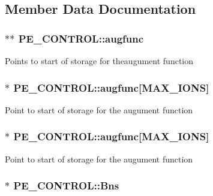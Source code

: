 \subsection{Member Data Documentation}
\hypertarget{struct_p_e___c_o_n_t_r_o_l_a850c9a27b78d815bc0a4f0f4bddc673e}{
\subsubsection[{augfunc}]{$\ast$$\ast$ P\-E\-\_\-\-C\-O\-N\-T\-R\-O\-L\-::augfunc}}\label{struct_p_e___c_o_n_t_r_o_l_a850c9a27b78d815bc0a4f0f4bddc673e}
Points to start of storage for theaugument function \hypertarget{struct_p_e___c_o_n_t_r_o_l_a715bfa0ce895f0a0aa9a2a9dba0613cd}{
\subsubsection[{augfunc}]{$\ast$ P\-E\-\_\-\-C\-O\-N\-T\-R\-O\-L\-::augfunc\mbox{[}{\bf M\-A\-X\-\_\-\-I\-O\-N\-S}\mbox{]}}}\label{struct_p_e___c_o_n_t_r_o_l_a715bfa0ce895f0a0aa9a2a9dba0613cd}
Point to start of storage for the augument function \hypertarget{struct_p_e___c_o_n_t_r_o_l_abe8ee2a8a452f14619312e9d70704a2f}{
\subsubsection[{augfunc}]{$\ast$ P\-E\-\_\-\-C\-O\-N\-T\-R\-O\-L\-::augfunc\mbox{[}{\bf M\-A\-X\-\_\-\-I\-O\-N\-S}\mbox{]}}}\label{struct_p_e___c_o_n_t_r_o_l_abe8ee2a8a452f14619312e9d70704a2f}
Point to start of storage for the augument function \hypertarget{struct_p_e___c_o_n_t_r_o_l_ad151e7a514277cecdd9f88b7a3bc8cad}{
\subsubsection[{Bns}]{$\ast$ P\-E\-\_\-\-C\-O\-N\-T\-R\-O\-L\-::\-Bns}}\label{struct_p_e___c_o_n_t_r_o_l_ad151e7a514277cecdd9f88b7a3bc8cad}
